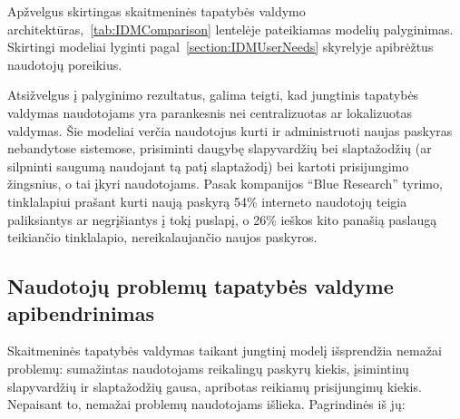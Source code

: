 
Apžvelgus skirtingas skaitmeninės tapatybės valdymo architektūras,\hypertarget{tab:IDMComparison}{~\ref{tab:IDMComparison}} lentelėje pateikiamas modelių palyginimas.
Skirtingi modeliai lyginti pagal\hypertarget{section:IDMUserNeeds}{~\ref{section:IDMUserNeeds}} skyrelyje apibrėžtus naudotojų poreikius. 

Atsižvelgus į palyginimo rezultatus, galima teigti, kad jungtinis tapatybės valdymas naudotojams yra parankesnis nei centralizuotas
ar lokalizuotas valdymas. Šie modeliai verčia naudotojus kurti ir administruoti naujas paskyras nebandytose sistemose,
prisiminti daugybę slapyvardžių bei slaptažodžių (ar silpninti saugumą naudojant tą patį slaptažodį) bei kartoti prisijungimo žingsnius,
o tai įkyri naudotojams. Pasak kompanijos \enquote{Blue Research} tyrimo, tinklalapiui prašant kurti naują paskyrą 54\% interneto naudotojų
teigia paliksiantys ar negrįšiantys į tokį puslapį, o 26\% ieškos kito panašią paslaugą teikiančio tinklalapio, nereikalaujančio naujos paskyros. 



\subsection{Naudotojų problemų tapatybės valdyme apibendrinimas} \label{IDM:problemsSummarized}

Skaitmeninės tapatybės valdymas taikant jungtinį modelį išsprendžia nemažai problemų: sumažintas
naudotojams reikalingų paskyrų kiekis, įsimintinų slapyvardžių ir slaptažodžių gausa, apribotas
reikiamų prisijungimų kiekis. Nepaisant to, nemažai problemų naudotojams išlieka. Pagrindinės iš jų:

